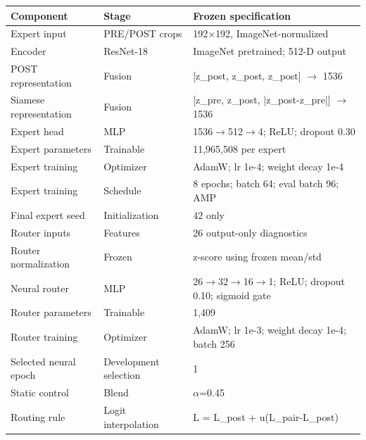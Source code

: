 \begin{tabular}{lll}
\toprule
Component & Stage & Frozen specification \\
\midrule
Expert input & PRE/POST crops & 192\(\times\)192, ImageNet-normalized \\
Encoder & ResNet-18 & ImageNet pretrained; 512-D output \\
POST representation & Fusion & [z\_post, z\_post, z\_post] \(\rightarrow\) 1536 \\
Siamese representation & Fusion & [z\_pre, z\_post, |z\_post-z\_pre|] \(\rightarrow\) 1536 \\
Expert head & MLP & 1536\(\rightarrow\)512\(\rightarrow\)4; ReLU; dropout 0.30 \\
Expert parameters & Trainable & 11,965,508 per expert \\
Expert training & Optimizer & AdamW; lr 1e-4; weight decay 1e-4 \\
Expert training & Schedule & 8 epochs; batch 64; eval batch 96; AMP \\
Final expert seed & Initialization & 42 only \\
Router inputs & Features & 26 output-only diagnostics \\
Router normalization & Frozen & z-score using frozen mean/std \\
Neural router & MLP & 26\(\rightarrow\)32\(\rightarrow\)16\(\rightarrow\)1; ReLU; dropout 0.10; sigmoid gate \\
Router parameters & Trainable & 1,409 \\
Router training & Optimizer & AdamW; lr 1e-3; weight decay 1e-4; batch 256 \\
Selected neural epoch & Development selection & 1 \\
Static control & Blend & \(\alpha\)=0.45 \\
Routing rule & Logit interpolation & L = L\_post + u(L\_pair-L\_post) \\
\bottomrule
\end{tabular}
